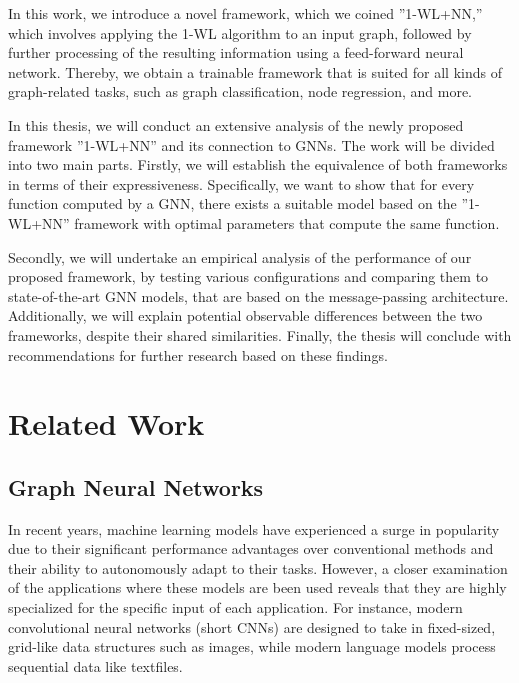 \documentclass[11pt, dvipsnames, DIV=12]{scrreprt}
\theoremstyle{definition}
\begin{document}
In this work, we introduce a novel framework, which we coined ''1-WL+NN,'' which involves applying the 1-WL algorithm to an input graph, followed by further processing of the resulting information using a feed-forward neural network. Thereby, we obtain a trainable framework that is suited for all kinds of graph-related tasks, such as graph classification, node regression, and more.

In this thesis, we will conduct an extensive analysis of the newly proposed framework ''1-WL+NN'' and its connection to GNNs. The work will be divided into two main parts. Firstly, we will establish the equivalence of both frameworks in terms of their expressiveness. Specifically, we want to show that for every function computed by a GNN, there exists a suitable model based on the ''1-WL+NN'' framework with optimal parameters that compute the same function.

Secondly, we will undertake an empirical analysis of the performance of our proposed framework, by testing various configurations and comparing them to state-of-the-art GNN models, that are based on the message-passing architecture. Additionally, we will explain potential observable differences between the two frameworks, despite their shared similarities. Finally, the thesis will conclude with recommendations for further research based on these findings.

\section{Related Work}
\subsection{Graph Neural Networks}
In recent years, machine learning models have experienced a surge in popularity due to their significant performance advantages over conventional methods and their ability to autonomously adapt to their tasks. However, a closer examination of the applications where these models are been used reveals that they are highly specialized for the specific input of each application. For instance, modern convolutional neural networks (short CNNs) are designed to take in fixed-sized, grid-like data structures such as images, while modern language models process sequential data like textfiles.
\end{document}
